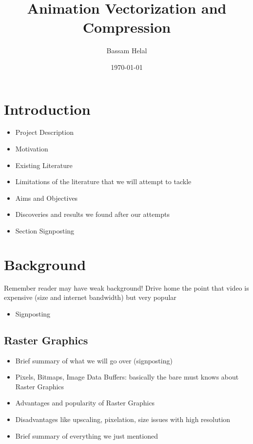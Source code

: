 \documentclass[14pt]{article}
\title{Animation Vectorization and Compression}
\author{Bassam Helal}
\date{ \today }
\begin{document}
    \pagecolor{black}
    \color{white}

    \maketitle

    \pagebreak

    \renewcommand*\contentsname{Table of Contents}

    \tableofcontents

    \pagebreak


    \section{Introduction}

    \begin{itemize}
        \item Project Description
        \item Motivation
        \item Existing Literature
        \item Limitations of the literature that we will attempt to tackle
        \item Aims and Objectives
        \item Discoveries and results we found after our attempts
        \item Section Signposting
    \end{itemize}


    \section{Background}

    Remember reader may have weak background!
    \linebreak
    Drive home the point that video is expensive (size and internet bandwidth) but very popular

    \begin{itemize}
        \item Signposting
    \end{itemize}

    \subsection{Raster Graphics}

    \begin{itemize}
        \item Brief summary of what we will go over (signposting)
        \item Pixels, Bitmaps, Image Data Buffers: basically the bare must knows about Raster Graphics
        \item Advantages and popularity of Raster Graphics
        \item Disadvantages like upscaling, pixelation, size issues with high resolution
        \item Brief summary of everything we just mentioned
    \end{itemize}
\end{document}
